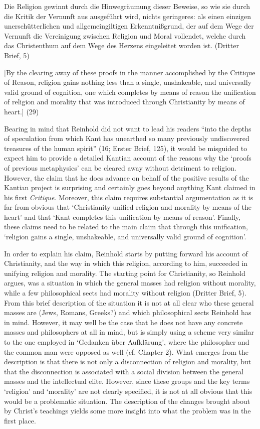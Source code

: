 Die Religion gewinnt durch die Hinwegr\"{a}umung dieser Beweise, so wie sie durch die Kritik der Vernunft aus ausgef\"{u}hrt wird, nichts geringeres: als einen einzigen unersch\"{u}tterlichen und allgemeingiltigen Erkenntni\ss{}grund, der auf dem Wege der Vernunft die Vereinigung zwischen Religion und Moral vollendet, welche durch das Christenthum auf dem Wege des Herzens eingeleitet worden ist. (Dritter Brief, 5)

[By the clearing away of these proofs in the manner accomplished by the Critique of Reason, religion gains nothing less than a single, unshakeable, and universally valid ground of cognition, one which completes by means of reason the unification of religion and morality that was introduced through Christianity by means of heart.] (29) 

Bearing in mind that Reinhold did not want to lead his readers ``into the depths of speculation from which Kant has unearthed so many previously undiscovered treasures of the human spirit'' (16; Erster Brief, 125), it would be misguided to expect him to provide a detailed Kantian account of the reasons why the `proofs of previous metaphysics' can be cleared away without detriment to religion. However, the claim that he does advance on behalf of the positive results of the Kantian project is surprising and certainly goes beyond anything Kant claimed in his first \textit{Critique}. Moreover, this claim requires substantial argumentation as it is far from obvious that `Christianity unified religion and morality by means of the heart' and that `Kant completes this unification by means of reason'. Finally, these claims need to be related to the main claim that through this unification, `religion gains a single, unshakeable, and universally valid ground of cognition'.

 In order to explain his claim, Reinhold starts by putting forward his account of Christianity, and the way in which this religion, according to him, succeeded in unifying religion and morality. The starting point for Christianity, so Reinhold argues, was a situation in which the general masses had religion without morality, while a few philosophical sects had morality without religion (Dritter Brief, 5). From this brief description of the situation it is not at all clear who these general masses are (Jews, Romans, Greeks?) and which philosophical sects Reinhold has in mind. However, it may well be the case that he does not have any concrete masses and philosophers at all in mind, but is simply using a scheme very similar to the one employed in `Gedanken \"{u}ber Aufkl\"{a}rung', where the philosopher and the common man were opposed as well (cf. Chapter 2). What emerges from the description is that there is not only a disconnection of religion and morality, but that the disconnection is associated with a social division between the general masses and the intellectual elite. However, since these groups and the key terms `religion' and `morality' are not clearly specified, it is not at all obvious that this would be a problematic situation. The description of the changes brought about by Christ's teachings yields some more insight into what the problem was in the first place.


